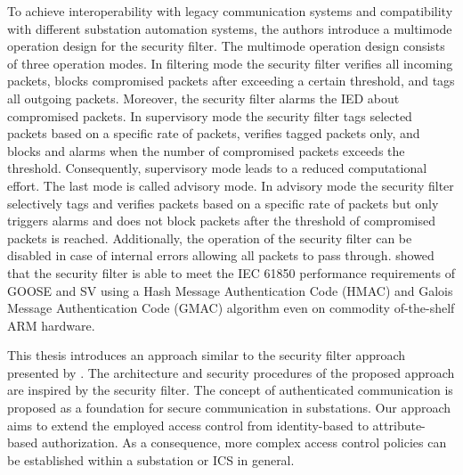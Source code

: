 To achieve interoperability with legacy communication systems and compatibility with different substation automation systems, the authors introduce a multimode operation design for the security filter.
The multimode operation design consists of three operation modes.
In filtering mode the security filter verifies all incoming packets, blocks compromised packets after exceeding a certain threshold, and tags all outgoing packets.
Moreover, the security filter alarms the IED about compromised packets.
In supervisory mode the security filter tags selected packets based on a specific rate of packets, verifies tagged packets only, and blocks and alarms when the number of compromised packets exceeds the threshold.
Consequently, supervisory mode leads to a reduced computational effort.
The last mode is called advisory mode.
In advisory mode the security filter selectively tags and verifies packets based on a specific rate of packets but only triggers alarms and does not block packets after the threshold of compromised packets is reached.
Additionally, the operation of the security filter can be disabled in case of internal errors allowing all packets to pass through.
\citeauthor{Ishchenko2018} showed that the security filter is able to meet the IEC 61850 performance requirements of GOOSE and SV \cite{IEC61850P5} using a Hash Message Authentication Code (HMAC) and Galois Message Authentication Code (GMAC) algorithm even on commodity of-the-shelf ARM hardware.

This thesis introduces an approach similar to the security filter approach presented by \citeauthor{Ishchenko2018}.
The architecture and security procedures of the proposed approach are inspired by the security filter.
The concept of authenticated communication is proposed as a foundation for secure communication in substations.
Our approach aims to extend the employed access control from identity-based to attribute-based authorization.
As a consequence, more complex access control policies can be established within a substation or ICS in general.

